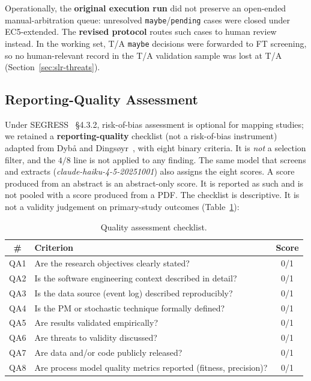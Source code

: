 Operationally, the \textbf{original execution run} did not preserve an
open-ended manual-arbitration queue: unresolved \texttt{maybe}/\texttt{pending}
cases were closed under EC5-extended. The \textbf{revised protocol} routes
such cases to human review instead. In the working set, T/A \texttt{maybe}
decisions were forwarded to FT screening, so no human-relevant record in the
T/A validation sample was lost at T/A (Section~\ref{sec:slr-threats}).


\subsection{Reporting-Quality Assessment}
\label{sec:slr-qa}

Under SEGRESS~\cite{kitchenham2023segress} \S4.3.2, risk-of-bias assessment
is optional for mapping studies; we retained a \textbf{reporting-quality}
checklist (not a risk-of-bias instrument) adapted from
Dyb{\aa} and Dings{\o}yr~\cite{dyba2008}, with eight binary criteria. It is
\emph{not} a selection filter, and the $4/8$ line is not applied to any
finding. The same model that screens and extracts
(\textit{claude-haiku-4-5-20251001}) also assigns the eight scores. A score
produced from an abstract is an abstract-only score. It is reported as such
and is not pooled with a score produced from a PDF. The checklist is
descriptive. It is not a validity judgement on primary-study outcomes
(Table~\ref{tab:qa}):

\begin{table}[htbp]
\centering
\caption{Quality assessment checklist.}
\label{tab:qa}
\begin{tabular}{clc}
\toprule
\textbf{\#} & \textbf{Criterion} & \textbf{Score} \\
\midrule
QA1 & Are the research objectives clearly stated?                    & 0/1 \\
QA2 & Is the software engineering context described in detail?       & 0/1 \\
QA3 & Is the data source (event log) described reproducibly?         & 0/1 \\
QA4 & Is the PM or stochastic technique formally defined?            & 0/1 \\
QA5 & Are results validated empirically?                             & 0/1 \\
QA6 & Are threats to validity discussed?                             & 0/1 \\
QA7 & Are data and/or code publicly released?                              & 0/1 \\
QA8 & Are process model quality metrics reported (fitness, precision)?& 0/1 \\
\bottomrule
\end{tabular}
\end{table}

